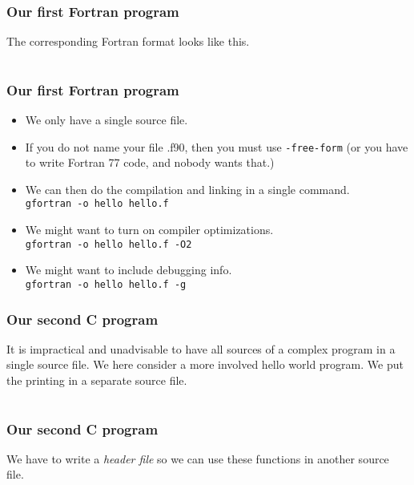 \begin{frame}[fragile]
  \frametitle{Our first Fortran program}
  The corresponding Fortran format looks like this.
  \begin{center}
    \begin{tabular}{c}
      
    \end{tabular}
  \end{center}
\end{frame}

\begin{frame}
  \frametitle{Our first Fortran program}
  \begin{itemize}
    \item We only have a single source file.
    \item If you do not name your file .f90, then you must use
      \texttt{-free-form} (or you have to write Fortran 77 code, and nobody
      wants that.)
    \item We can then do the compilation and linking in a single command. \\
      \texttt{gfortran -o hello hello.f}
    \item We might want to turn on compiler optimizations. \\
      \texttt{gfortran -o hello hello.f -O2}
    \item We might want to include debugging info. \\
      \texttt{gfortran -o hello hello.f -g}
  \end{itemize}
\end{frame}

\begin{frame}[fragile]
  \frametitle{Our second C program}
  It is impractical and unadvisable to have all sources of a complex program in
  a single source file. We here consider a more involved hello world program. We
  put the printing in a separate source file.
  \begin{center}
    \begin{tabular}{c}
      
    \end{tabular}
  \end{center}
\end{frame}

\begin{frame}[fragile]
  \frametitle{Our second C program}
  We have to write a \emph{header file} so we can use these functions in another
  source file.
  \begin{center}
    \begin{tabular}{c}
      
    \end{tabular}
  \end{center}
\end{frame}

